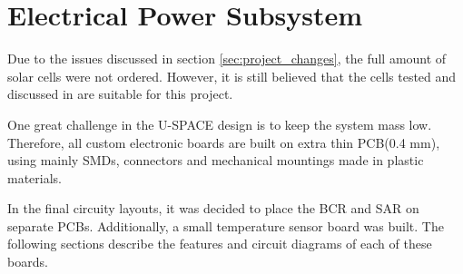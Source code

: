 \section{Electrical Power Subsystem}
%
Due to the issues discussed in section \ref{sec:project_changes}, the full amount of solar cells were not ordered. However, it is still believed that the cells tested and discussed in \cite{CDR} are suitable for this project.

One great challenge in the U-SPACE design is to keep the system mass low. Therefore, all custom electronic boards are built on extra thin \ac{PCB}(0.4 mm), using mainly \acp{SMD}, connectors and mechanical mountings made in plastic materials.

In the final circuity layouts, it was decided to place the \ac{BCR} and \ac{SAR} on separate \acp{PCB}. Additionally, a small temperature sensor board was built. The following sections describe the features and circuit diagrams of each of these boards.
%
%
%

